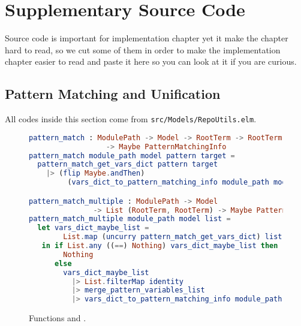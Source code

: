\documentclass[master.tex]{subfiles}
\begin{document}
\chapter{Supplementary Source Code}
\label{chap:supplementary_source_code}

Source code is important for implementation chapter yet it make the chapter hard
to read, so we cut some of them in order to make the implementation chapter
easier to read and paste it here so you can look at it if you are curious.

\section{Pattern Matching and Unification}
All codes inside this section come from \texttt{src/Models/RepoUtils.elm}.


\begin{figure}[H]
\begin{framed}
\begin{lstlisting}[language=elm,basicstyle=\footnotesize\ttfamily]
pattern_match : ModulePath -> Model -> RootTerm -> RootTerm
                  -> Maybe PatternMatchingInfo
pattern_match module_path model pattern target =
  pattern_match_get_vars_dict pattern target
    |> (flip Maybe.andThen)
         (vars_dict_to_pattern_matching_info module_path model)

pattern_match_multiple : ModulePath -> Model
               -> List (RootTerm, RootTerm) -> Maybe PatternMatchingInfo
pattern_match_multiple module_path model list =
  let vars_dict_maybe_list =
        List.map (uncurry pattern_match_get_vars_dict) list
   in if List.any ((==) Nothing) vars_dict_maybe_list then
        Nothing
      else
        vars_dict_maybe_list
          |> List.filterMap identity
          |> merge_pattern_variables_list
          |> vars_dict_to_pattern_matching_info module_path model
\end{lstlisting}
\end{framed}
\caption{Functions  and .}
\label{fig:supp-pattern-matching-info}
\end{figure}
\end{document}
